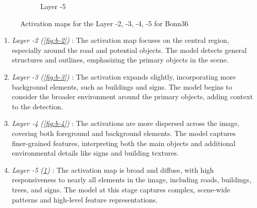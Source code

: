 \begin{figure}[h!]
\begin{subfigure}[b]{0.49\textwidth}
        \caption{Layer -5}
        \label{fig:b-5}
    \end{subfigure}
    \hfill

    \caption{Activation maps for the Layer -2, -3, -4, -5 for Bonn36}
    \label{fig:Bonn_000036_000019}
\end{figure}



\begin{enumerate}
    \item \textit{Layer -2 (\ref{fig:b-2})} : The activation map focuses on the central region, especially around the road and potential objects. The model detects general structures and outlines, emphasizing the primary objects in the scene.
    \item \textit{Layer -3 (\ref{fig:b-3})} : The activation expands slightly, incorporating more background elements, such as buildings and signs. The model begins to consider the broader environment around the primary objects, adding context to the detection.
    \item \textit{Layer -4 (\ref{fig:b-4})} : The activations are more dispersed across the image, covering both foreground and background elements. The model captures finer-grained features, interpreting both the main objects and additional environmental details like signs and building textures.
    \item \textit{Layer -5 (\ref{fig:b-5})} : The activation map is broad and diffuse, with high responsiveness to nearly all elements in the image, including roads, buildings, trees, and signs. The model at this stage captures complex, scene-wide patterns and high-level feature representations.
\end{enumerate}





